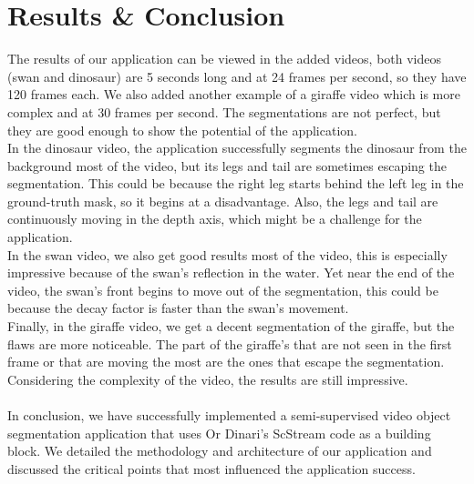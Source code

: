 \documentclass[12pt]{article}
\begin{document}
\section{Results \& Conclusion}\label{sec:conclusion}
The results of our application can be viewed in the added videos, both videos (swan and dinosaur) are 5 seconds long and at 24 frames per second, so they have 120 frames each.
We also added another example of a giraffe video which is more complex and at 30 frames per second.
The segmentations are not perfect, but they are good enough to show the potential of the application. \\
In the dinosaur video, the application successfully segments the dinosaur from the background most of the video, but its legs and tail are sometimes escaping the segmentation.
This could be because the right leg starts behind the left leg in the ground-truth mask, so it begins at a disadvantage.
Also, the legs and tail are continuously moving in the depth axis, which might be a challenge for the application. \\
In the swan video, we also get good results most of the video, this is especially impressive because of the swan's reflection in the water.
Yet near the end of the video, the swan's front begins to move out of the segmentation, this could be because the decay factor is faster than the swan's movement. \\
Finally, in the giraffe video, we get a decent segmentation of the giraffe, but the flaws are more noticeable.
The part of the giraffe's that are not seen in the first frame or that are moving the most are the ones that escape the segmentation.
Considering the complexity of the video, the results are still impressive. \\
\\
In conclusion, we have successfully implemented a semi-supervised video object segmentation application that uses Or Dinari's ScStream code as a building block.
We detailed the methodology and architecture of our application and discussed the critical points that most influenced the application success.
\end{document}
